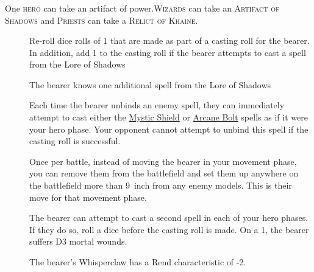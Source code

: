 \subsubsection{}
One \textsc{hero} can take an artifact of power.\textsc{Wizards} can take an \textsc{Artifact of Shadows} and \textsc{Priests} can take a \textsc{Relict of Khaine}.
\begin{description} 
    \item [] Re-roll dice rolls of 1 that
        are made as part of a casting roll for the bearer. In addition, add
        1 to the casting roll if the bearer attempts to cast a spell from the
        Lore of Shadows
    \item [] The bearer knows one
        additional spell from the Lore of Shadows 
    \item [] Each time the bearer
        unbinds an enemy spell, they can immediately attempt to cast either the
        \hyperref[mystic-shield]{Mystic Shield} or
        \hyperref[arcane-bolt]{Arcane Bolt} spells as if it were your hero
        phase. Your opponent cannot attempt to unbind this spell if the casting
        roll is
        successful.
    \item [] Once per battle,
        instead of moving the bearer in your movement phase, you can remove
        them from the battlefield and set them up anywhere on the battlefield
        more than 9~inch from any enemy models. This is their move for that
        movement phase.
    \item [] The bearer can attempt to
        cast a second spell in each of your hero phases. If they do so, roll
        a dice before the casting roll is made. On a 1, the bearer suffers D3
        mortal wounds.
    \item [] The bearer’s Whisperclaw has
        a Rend characteristic of -2.
\end{description} 

